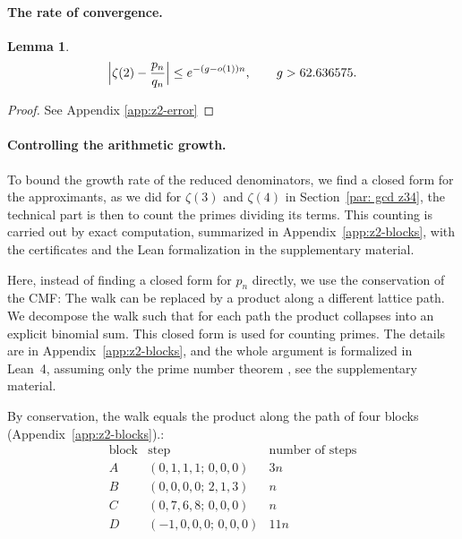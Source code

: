 \documentclass[oneside,english,11pt]{amsart}
\newtheorem{lemma}[thm]{Lemma}
\begin{document}
\paragraph{The rate of convergence.}

\begin{lemma}\label{lem:z2-selected-error}
\[
  \Bigl|\zeta(2)-\frac{p_{n}}{q_n}\Bigr|
  \le e^{-(g-o(1))n},\qquad g>62.636575 .
\]
\end{lemma}

\begin{proof}
See Appendix \ref{app:z2-error}
\end{proof}




\paragraph{Controlling the arithmetic growth.}
\label{subsubsec:zeta2-blocks}
To bound the growth rate of the reduced denominators, we find a closed form for the approximants, as we did for $\zeta(3)$ and $\zeta(4)$ in Section~\ref{par: gcd z34}, the technical part is then to count the primes dividing its terms. 
This counting is carried out by exact computation, summarized in Appendix~\ref{app:z2-blocks}, with the certificates and the Lean formalization in the supplementary material.

Here, instead of finding a closed form for $p_n$ directly, we use the conservation of the CMF: The walk can be replaced by a product along a different lattice path. We decompose the walk such that for each path the product collapses into an explicit binomial sum. This closed form is used for counting primes. The details are in Appendix~\ref{app:z2-blocks}, and the whole argument is formalized in Lean~4, assuming only the prime number theorem \cite{demoura2021lean4}, see the supplementary material.

By conservation, the walk equals the product along the path of four blocks (Appendix~\ref{app:z2-blocks}).:
\[
\begin{array}{c|c|c}
\text{block}&\text{step}&\text{number of steps}\\\hline
A&(0,1,1,1;\,0,0,0)&3n\\
B&(0,0,0,0;\,2,1,3)&n\\
C&(0,7,6,8;\,0,0,0)&n\\
D&(-1,0,0,0;\,0,0,0)&11n
\end{array}
\]
\end{document}

